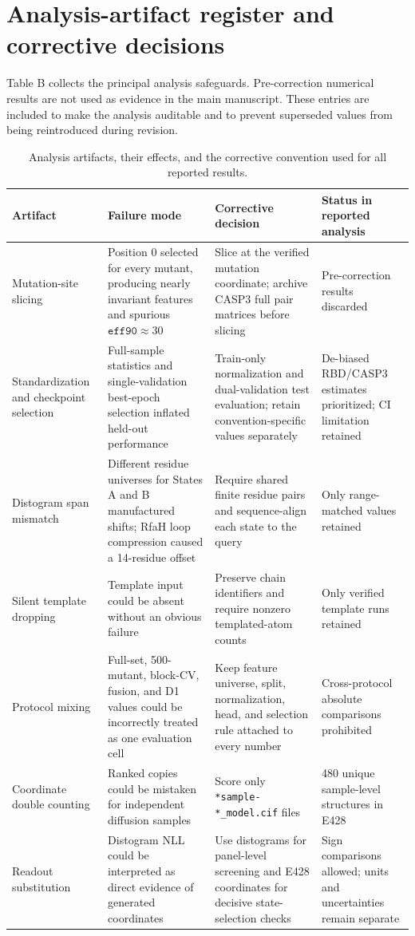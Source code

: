 \documentclass[10pt,a4paper]{article}
\begin{document}
\section{Analysis-artifact register and corrective decisions}

Table B collects the principal analysis safeguards. Pre-correction numerical results are not used as evidence in the main manuscript. These entries are included to make the analysis auditable and to prevent superseded values from being reintroduced during revision.

\begin{table}[!htbp]
\centering
\caption{Analysis artifacts, their effects, and the corrective convention used for all reported results.}
\label{tab:artifact_register}
\scriptsize
\begin{tabularx}{\textwidth}{l Y Y Y}
\toprule
\textbf{Artifact} & \textbf{Failure mode} & \textbf{Corrective decision} & \textbf{Status in reported analysis} \\
\midrule
Mutation-site slicing & Position 0 selected for every mutant, producing nearly invariant features and spurious $\texttt{eff90}\approx30$ & Slice at the verified mutation coordinate; archive CASP3 full pair matrices before slicing & Pre-correction results discarded \\
Standardization and checkpoint selection & Full-sample statistics and single-validation best-epoch selection inflated held-out performance & Train-only normalization and dual-validation test evaluation; retain convention-specific values separately & De-biased RBD/CASP3 estimates prioritized; CI limitation retained \\
Distogram span mismatch & Different residue universes for States A and B manufactured shifts; RfaH loop compression caused a 14-residue offset & Require shared finite residue pairs and sequence-align each state to the query & Only range-matched values retained \\
Silent template dropping & Template input could be absent without an obvious failure & Preserve chain identifiers and require nonzero templated-atom counts & Only verified template runs retained \\
Protocol mixing & Full-set, 500-mutant, block-CV, fusion, and D1 values could be incorrectly treated as one evaluation cell & Keep feature universe, split, normalization, head, and selection rule attached to every number & Cross-protocol absolute comparisons prohibited \\
Coordinate double counting & Ranked copies could be mistaken for independent diffusion samples & Score only \texttt{*sample-*\_model.cif} files & 480 unique sample-level structures in E428 \\
Readout substitution & Distogram NLL could be interpreted as direct evidence of generated coordinates & Use distograms for panel-level screening and E428 coordinates for decisive state-selection checks & Sign comparisons allowed; units and uncertainties remain separate \\
\bottomrule
\end{tabularx}
\end{table}
\end{document}

